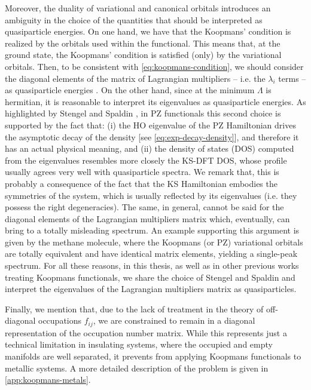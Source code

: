 Moreover, the duality of variational and canonical orbitals introduces an ambiguity in the choice of the quantities that should be interpreted as quasiparticle energies. On one hand, we have that the Koopmans' condition is realized by the orbitals used within the functional. This means that, at the ground state, the Koopmans' condition is satisfied (only) by the variational orbitals. Then, to be consistent with \cref{eq:koopmans-condition}, we should consider the diagonal elements of the matrix of Lagrangian multipliers -- i.e. the $\lambda_i$ terms -- as quasiparticle energies \cite{vydrov_tests_2007}. On the other hand, since at the minimum $\Lambda$ is hermitian, it is reasonable to interpret its eigenvalues as quasiparticle energies. As highlighted by Stengel and Spaldin \cite{stengel_self-interaction_2008}, in PZ functionals this second choice is supported by the fact that: (i) the HO eigenvalue of the PZ Hamiltonian drives the asymptotic decay of the density [see \cref{eq:exp-decay-density}], and therefore it has an actual physical meaning, and (ii) the density of states (DOS) computed from the eigenvalues resembles more closely the KS-DFT DOS, whose profile usually agrees very well with quasiparticle spectra. We remark that, this is probably a consequence of the fact that the KS Hamiltonian embodies the symmetries of the system, which is usually reflected by its eigenvalues (i.e. they possess the right degeneracies). The same, in general, cannot be said for the diagonal elements of the Lagrangian multipliers matrix which, eventually, can bring to a totally misleading spectrum. An example supporting this argument is given by the methane molecule, where the Koopmans (or PZ) variational orbitals are totally equivalent and have identical matrix elements, yielding a single-peak spectrum. For all these reasons, in this thesis, as well as in other previous works treating Koopmans functionals, we share the choice of Stengel and Spaldin and interpret the eigenvalues of the Lagrangian multipliers matrix as quasiparticles.

Finally, we mention that, due to the lack of treatment in the theory of off-diagonal occupations $f_{ij}$, we are constrained to remain in a diagonal representation of the occupation number matrix. While this represents just a technical limitation in insulating systems, where the occupied and empty manifolds are well separated, it prevents from applying Koopmans functionals to metallic systems. A more detailed description of the problem is given in \cref{app:koopmans-metals}.


